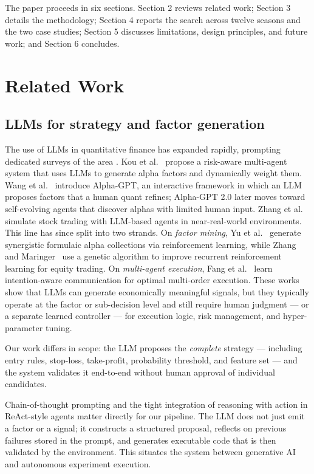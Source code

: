 \documentclass[analytics,article,submit,pdftex,moreauthors]{Definitions/mdpi}
\begin{document}
The paper proceeds in six sections. Section 2 reviews related work; Section 3 details the methodology; Section 4 reports the search across twelve seasons and the two case studies; Section 5 discusses limitations, design principles, and future work; and Section 6 concludes.

\section{Related Work}\label{related-work}

\subsection{LLMs for strategy and factor generation}\label{llms-for-strategy-and-factor-generation}

The use of LLMs in quantitative finance has expanded rapidly, prompting dedicated surveys of the area \citep{jadhav_mirza_2025}. Kou et al.~\citep{kou_2024} propose a risk-aware multi-agent system that uses LLMs to generate alpha factors and dynamically weight them. Wang et al.~\citep{wang_2023} introduce Alpha-GPT, an interactive framework in which an LLM proposes factors that a human quant refines; Alpha-GPT 2.0 \citep{yuan_2024} later moves toward self-evolving agents that discover alphas with limited human input. Zhang et al.~\citep{zhang_2024} simulate stock trading with LLM-based agents in near-real-world environments. This line has since split into two strands. On \emph{factor mining}, Yu et al.~\citep{yu_2023_synergistic_alpha} generate synergistic formulaic alpha collections via reinforcement learning, while Zhang and Maringer~\citep{zhang_maringer_2016} use a genetic algorithm to improve recurrent reinforcement learning for equity trading. On \emph{multi-agent execution}, Fang et al.~\citep{fang_2023_multi_agent} learn intention-aware communication for optimal multi-order execution. These works show that LLMs can generate economically meaningful signals, but they typically operate at the factor or sub-decision level and still require human judgment --- or a separate learned controller --- for execution logic, risk management, and hyper-parameter tuning.

Our work differs in scope: the LLM proposes the \emph{complete} strategy --- including entry rules, stop-loss, take-profit, probability threshold, and feature set --- and the system validates it end-to-end without human approval of individual candidates.

Chain-of-thought prompting \citep{wei_2022} and the tight integration of reasoning with action in ReAct-style agents \citep{yao_2023} matter directly for our pipeline. The LLM does not just emit a factor or a signal; it constructs a structured proposal, reflects on previous failures stored in the prompt, and generates executable code that is then validated by the environment. This situates the system between generative AI and autonomous experiment execution.
\end{document}
